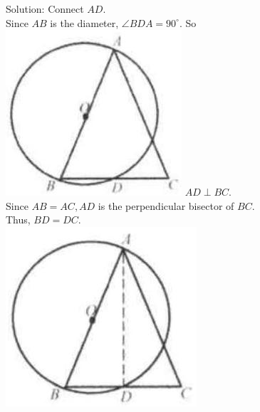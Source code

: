 \documentclass[10pt]{article}
\begin{document}
Solution:
Connect \(A D\).\\
Since \(A B\) is the diameter, \(\angle B D A=90^{\circ}\). So\\
\includegraphics[max width=\textwidth]{2025_04_17_97bc1f7e44d93c271a88g-163} \(A D \perp B C\).\\
Since \(A B=A C, A D\) is the perpendicular bisector of \(B C\).\\
Thus, \(B D=D C\).\\
\includegraphics[max width=\textwidth, center]{2025_04_17_97bc1f7e44d93c271a88g-163(1)}
\end{document}
